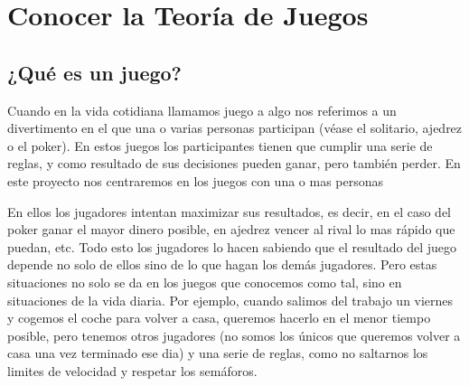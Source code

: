 \documentclass[12pt,a4paper,]{book}
\title{}
\author{Nombre Completo Autor}
\date{18/11/2021}
\def\ifdoblecara{} %
\def\ifprincipal{} %
\let\ifprincipal\undefined %
\numberwithin{dummy}{section}
\theoremstyle{ocrenumbox}
\theoremstyle{blacknumex}
\theoremstyle{blacknumbox}
\theoremstyle{ocrenum}
\theoremstyle{ocrenum}
\begin{document}




\raggedbottom

\ifdefined\ifprincipal
\else
\setlength{\parindent}{1em}
\pagestyle{fancy}
\setcounter{tocdepth}{4}
\tableofcontents

\fi

\ifdefined\ifdoblecara
\fancyhead{}{}
\fancyhead[LE,RO]{\scriptsize\rightmark}
\fancyfoot[LO,RE]{\scriptsize\slshape \leftmark}
\fancyfoot[C]{}
\fancyfoot[LE,RO]{\footnotesize\thepage}
\else
\fancyhead{}{}
\fancyhead[RO]{\scriptsize\rightmark}
\fancyfoot[LO]{\scriptsize\slshape \leftmark}
\fancyfoot[C]{}
\fancyfoot[RO]{\footnotesize\thepage}
\fi

\renewcommand{\headrulewidth}{0.4pt}
\renewcommand{\footrulewidth}{0.4pt}

\hypertarget{Seccion1}{%
\chapter{Conocer la Teoría de Juegos}\label{Seccion1}}

\hypertarget{Seccion11}{%
\section{¿Qué es un juego?}\label{Seccion11}}

Cuando en la vida cotidiana llamamos juego a algo nos referimos a un
divertimento en el que una o varias personas participan (véase el
solitario, ajedrez o el poker). En estos juegos los participantes tienen
que cumplir una serie de reglas, y como resultado de sus decisiones
pueden ganar, pero también perder. En este proyecto nos centraremos en
los juegos con una o mas personas

En ellos los jugadores intentan maximizar sus resultados, es decir, en
el caso del poker ganar el mayor dinero posible, en ajedrez vencer al
rival lo mas rápido que puedan, etc. Todo esto los jugadores lo hacen
sabiendo que el resultado del juego depende no solo de ellos sino de lo
que hagan los demás jugadores. Pero estas situaciones no solo se da en
los juegos que conocemos como tal, sino en situaciones de la vida
diaria. Por ejemplo, cuando salimos del trabajo un viernes y cogemos el
coche para volver a casa, queremos hacerlo en el menor tiempo posible,
pero tenemos otros jugadores (no somos los únicos que queremos volver a
casa una vez terminado ese dia) y una serie de reglas, como no saltarnos
los limites de velocidad y respetar los semáforos.
\end{document}
